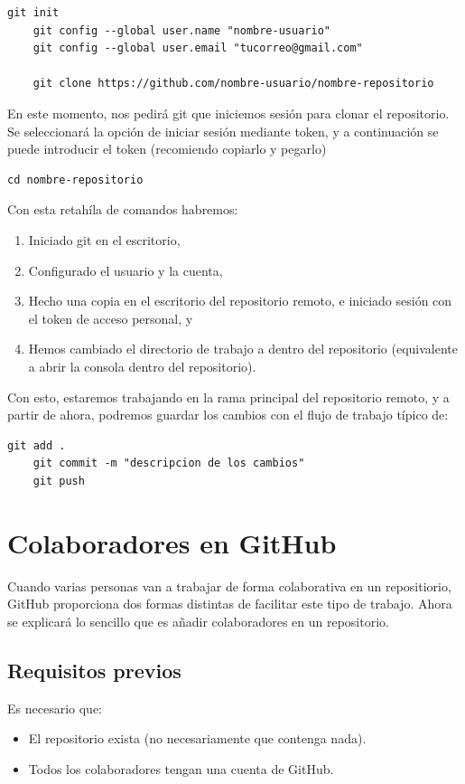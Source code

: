 \documentclass[
twoside,
12pt,                   
]{article}
\begin{document}
\begin{lstlisting}[style=powershell]
    git init
    git config --global user.name "nombre-usuario"
    git config --global user.email "tucorreo@gmail.com"

    git clone https://github.com/nombre-usuario/nombre-repositorio
\end{lstlisting}
En este momento, nos pedirá git que iniciemos sesión para clonar el repositorio. Se seleccionará la opción de iniciar sesión mediante token, y a continuación se puede introducir el token (recomiendo copiarlo y pegarlo)
\begin{lstlisting}[style=powershell]
    cd nombre-repositorio
\end{lstlisting}
Con esta retahíla de comandos habremos:
\begin{enumerate}
    \item Iniciado git en el escritorio,
    \item Configurado el usuario y la cuenta,
    \item Hecho una copia en el escritorio del repositorio remoto, e iniciado sesión con el token de acceso personal, y
    \item Hemos cambiado el directorio de trabajo a dentro del repositorio (equivalente a abrir la consola dentro del repositorio).
\end{enumerate}
Con esto, estaremos trabajando en la rama principal del repositorio remoto, y a partir de ahora, podremos guardar los cambios con el flujo de trabajo típico de:
\begin{lstlisting}[style=powershell]
    git add .
    git commit -m "descripcion de los cambios"
    git push
\end{lstlisting}

\section{Colaboradores en GitHub}
Cuando varias personas van a trabajar de forma colaborativa en un repositiorio, GitHub proporciona dos formas distintas de facilitar este tipo de trabajo. Ahora se explicará lo sencillo que es añadir colaboradores en un repositorio.

\subsection{Requisitos previos}
Es necesario que:
\begin{itemize}
    \item El repositorio exista (no necesariamente que contenga nada).
    \item Todos los colaboradores tengan una cuenta de GitHub.
\end{itemize}
\end{document}
